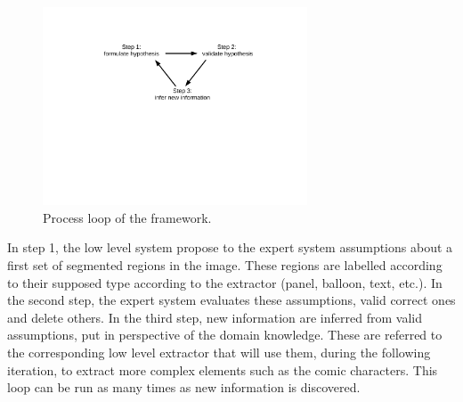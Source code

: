 \begin{figure}[!ht]  %
   \centering
  \includegraphics[trim= 140px 315px 100px 95px, clip, width=0.7\textwidth]{process_loop.pdf}
  \caption[Process loop of the knowledge-driven system]{Process loop of the framework.}
  \label{fig:kn:process_loop}
 \end{figure}


In step 1, the low level system propose to the expert system assumptions about a first set of segmented regions in the image.
These regions are labelled according to their supposed type according to the extractor (panel, balloon, text, etc.).
In the second step, the expert system evaluates these assumptions, valid correct ones and delete others.
In the third step, new information are inferred from valid assumptions, put in perspective of the domain knowledge.
These are referred to the corresponding low level extractor that will use them, during the following iteration, to extract more complex elements such as the comic characters.
This loop can be run as many times as new information is discovered.


